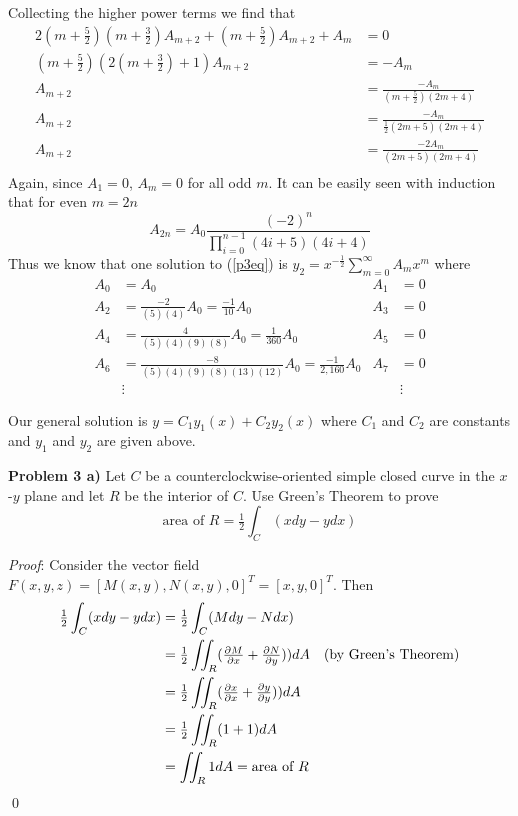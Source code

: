 \documentclass[12pt]{article}
\newcommand{\problem}[1]{\hspace{-4 ex} \large \textbf{Problem #1} }
\renewenvironment{proof}{\hspace{-4 ex} \emph{Proof}:}{\qed}
\begin{document}
	Collecting the higher power terms we find that
	\begin{align*}
		2(m+\tfrac{5}{2})(m+\tfrac{3}{2})A_{m+2} + (m+\tfrac{5}{2})A_{m+2} + A_m & = 0 \\
		(m+\tfrac{5}{2})(2(m+\tfrac{3}{2})+1)A_{m+2} & = - A_m \\
		A_{m+2} & = \frac{-A_m}{(m+\tfrac{5}{2})(2m+4)} \\
		A_{m+2} & = \frac{-A_m}{\tfrac{1}{2}(2m+5)(2m+4)} \\
		A_{m+2} & = \frac{-2A_m}{(2m+5)(2m+4)} \\
	\end{align*}
	Again, since $A_1=0$, $A_m = 0$ for all odd $m$. It can be easily seen with induction that for even $m=2n$
	$$
	A_{2n} = A_0 \frac{(-2)^n}{\prod\limits_{i=0}^{n-1}(4i+5)(4i+4)}
	$$
	Thus we know that one solution to (\ref{p3eq}) is $y_2 =  x^{-\frac{1}{2}} \sum\limits_{m=0}^\infty A_m x^m$ where 
	\begin{align*}
		A_0 & = A_0 & A_1 & = 0 \\
		A_2 & = \tfrac{-2}{(5)(4)}A_0 = \tfrac{-1}{10}A_0 & A_3 & = 0 \\
		A_4 & = \tfrac{4}{(5)(4)(9)(8)}A_0 = \tfrac{1}{360}A_0 & A_5 & = 0 \\
		A_6 & = \tfrac{-8}{(5)(4)(9)(8)(13)(12)}A_0 = \tfrac{-1}{2,160}A_0 & A_7 & = 0 \\
		& \vdots & & \vdots
	\end{align*}
	
	Our general solution is $y = C_1 y_1(x) + C_2 y_2(x)$ where $C_1$ and $C_2$ are constants and $y_1$ and $y_2$ are given above.
	
\problem{3 a)} Let $C$ be a counterclockwise-oriented simple closed curve in the $x$-$y$ plane and let $R$ be the interior of $C$. Use Green's Theorem to prove 
$$
\text{area of }R = \tfrac{1}{2}\int_C(xdy-ydx)
$$

	\begin{proof}
		Consider the vector field $F(x,y,z) = [M(x,y), N(x,y), 0]^T = [x, y, 0]^T$. Then
		\begin{align*}
			\tfrac{1}{2}\int_C(xdy-ydx) & = \tfrac{1}{2}\int_C(Mdy-Ndx) \\
			& = \tfrac{1}{2} \iint_R (\tfrac{\partial M}{\partial x} + \tfrac{\partial N}{\partial y}))dA \text{\space \space \space(by Green's Theorem)}\\
			& = \tfrac{1}{2} \iint_R (\tfrac{\partial x}{\partial x} + \tfrac{\partial y}{\partial y}))dA \\
			& = \tfrac{1}{2} \iint_R (1 + 1)dA \\
			& = \iint_R 1 dA = \text{area of }R
		\end{align*}
	\end{proof}
\end{document}
